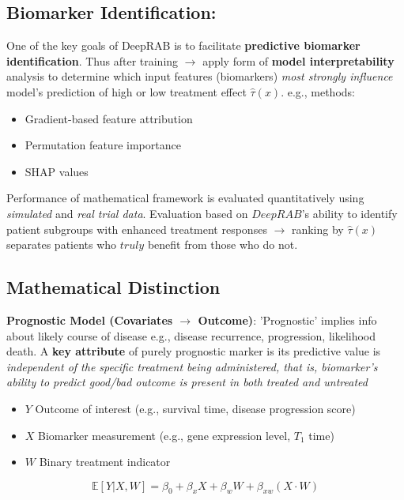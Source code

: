 \documentclass[../main.tex]{subfiles}
\begin{document}
\subsection*{Biomarker Identification:} One of the key goals of DeepRAB is to facilitate \textbf{predictive biomarker identification}. Thus after training $\rightarrow$ apply form of \textbf{model interpretability} analysis to determine which input features (biomarkers) \textit{most strongly influence} model's prediction of high or low treatment effect $\hat{\tau}(x)$. e.g., methods: 
\begin{itemize}
    \item Gradient-based feature attribution 
    \item Permutation feature importance
    \item SHAP values
\end{itemize}

 Performance of mathematical framework is evaluated quantitatively using \textit{simulated} and \textit{real trial data}. Evaluation based on $DeepRAB$'s ability to identify patient subgroups with enhanced treatment responses $\rightarrow$ ranking by $\hat{\tau}(x)$ separates patients who $truly$ benefit from those who do not.

 \subsection*{Mathematical Distinction}

 \textbf{Prognostic Model (Covariates $\rightarrow$ Outcome)}:
 'Prognostic' implies info about likely course of disease e.g., disease recurrence, progression, likelihood death. A \textbf{key attribute} of purely prognostic marker is its predictive value is \textit{independent of the specific treatment being administered, that is, biomarker's ability to predict good/bad outcome is present in \textit{both} treated and untreated} 

\begin{itemize}
    \item $Y$ Outcome of interest (e.g., survival time, disease progression score) 
    \item $X$ Biomarker measurement (e.g., gene expression level, $T_1$ time)
    \item $W$ Binary treatment indicator
\end{itemize}
     
 \begin{center}
     \[
    \mathbb{E}[Y|X,W] = \beta_0 + \beta_x X + \beta_w W + \beta_{xw}(X \cdot W)
    \]
 \end{center}
\end{document}
